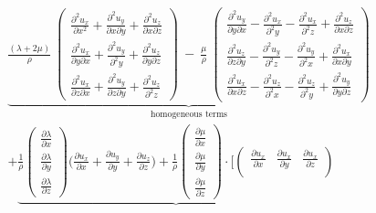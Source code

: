 \documentclass[]{article}
\begin{document}
	\begin{align}
		\underbrace{\frac{(\lambda + 2\mu)}{\rho} \: 
			\begin{pmatrix}
				\frac{\partial^{2}u_{x}}{\partial x^{2}} +  \frac{\partial^{2}u_{y}}{\partial x \partial y} + \frac{\partial^{2}u_{z}}{\partial x \partial z} \\
				\frac{\partial^{2}u_{x}}{\partial y \partial x} +  \frac{\partial^{2}u_{y}}{\partial^{2} y } + \frac{\partial^{2}u_{z}}{\partial y \partial z}   \\
				\frac{\partial^{2}u_{x}}{\partial z \partial x} +  \frac{\partial^{2}u_{y}}{\partial z \partial y} + \frac{\partial^{2}u_{z}}{\partial^{2} z} 
			\end{pmatrix} 
			\: - \: \frac{\mu}{\rho} \:
			\begin{pmatrix}
				\frac{\partial^{2}u_{y}}{\partial y \partial x} -  \frac{\partial^{2}u_{x}}{\partial^{2} y } -  \frac{\partial^{2}u_{x}}{\partial^{2} z} + \frac{\partial^{2}u_{z}}{\partial x \partial z} \\
				\frac{\partial^{2}u_{z}}{\partial z \partial y} -  \frac{\partial^{2}u_{y}}{\partial^{2} z } -  \frac{\partial^{2}u_{y}}{\partial^{2} x} + \frac{\partial^{2}u_{x}}{\partial x \partial y}   \\
				\frac{\partial^{2}u_{x}}{\partial x \partial z} -  \frac{\partial^{2}u_{z}}{\partial^{2} x } -  \frac{\partial^{2}u_{z}}{\partial^{2} y} + \frac{\partial^{2}u_{y}}{\partial y \partial z}
		\end{pmatrix}}_\text{homogeneous terms} \\ \nonumber
		+ \underbrace{\frac{1}{\rho}
			\begin{pmatrix}
				\frac{\partial \lambda}{\partial x}\\
				\frac{\partial \lambda}{\partial y}\\
				\frac{\partial \lambda}{\partial z}
			\end{pmatrix}
			\Big(\frac{\partial u_{x}}{\partial x} + \frac{\partial u_{y}}{\partial y} +\frac{\partial u_{z}}{\partial z}\Big) + \frac{1}{\rho} 
			\begin{pmatrix}
				\frac{\partial \mu}{\partial x}\\
				\frac{\partial \mu}{\partial y}\\
				\frac{\partial \mu}{\partial z}
			\end{pmatrix}
			\cdot  \Bigg[
			\begin{pmatrix}
				\frac{\partial u_{x}}{\partial x} & \frac{\partial u_{x}}{\partial y} & \frac{\partial u_{x}}{\partial z}\\

\end{pmatrix}}
\end{align}
\end{document}
